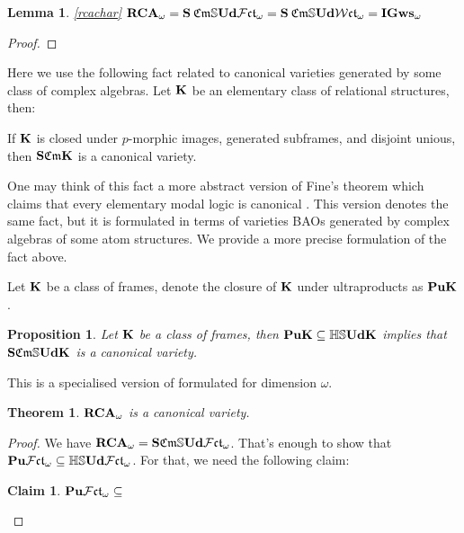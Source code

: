 \documentclass[a4paper]{article}
\theoremstyle{defin}
\theoremstyle{theorem}
\newtheorem{theorem}{Theorem}
\theoremstyle{claim}
\newtheorem{claim}{Claim}
\theoremstyle{prop}
\newtheorem{prop}{Proposition}
\theoremstyle{lemma}
\newtheorem{lemma}{Lemma}
\theoremstyle{fact}
\theoremstyle{ex}
\theoremstyle{col}
\begin{document}
\begin{lemma} \ref{rcachar}
${\bf RCA}_{\omega} = {\bf S} \: \mathfrak{Cm} \mathbb{S} {\bf Ud} \mathcal{F} \mathfrak{ct}_{\omega} = {\bf S} \: \mathfrak{Cm} \mathbb{S} {\bf Ud} \mathcal{W} \mathfrak{ct}_{\omega} = {\bf IGws}_{\omega}$
\end{lemma}

\begin{proof}

\end{proof}

Here we use the following fact related to canonical varieties generated by some class of complex algebras. Let ${\bf K}$ be an elementary class of relational structures, then:
\begin{center}
If ${\bf K}$ is closed under $p$-morphic images, generated subframes, and disjoint unious, \\ then ${\bf S} \mathfrak{Cm} {\bf K}$ is a canonical variety.
\end{center}
One may think of this fact a more abstract version of Fine's theorem which claims that every elementary modal logic is canonical \cite{fine1975some}. This version denotes the same fact, but it is formulated in terms of varieties BAOs generated by complex algebras of some atom structures. We provide a more precise formulation of the fact above.

Let ${\bf K}$ be a class of frames, denote the closure of ${\bf K}$ under ultraproducts as ${\bf Pu} {\bf K}$.

\begin{prop}
Let ${\bf K}$ be a class of frames, then ${\bf Pu}{\bf K} \subseteq \mathbb{H}\mathbb{S}{\bf Ud} {\bf K}$ implies that ${\bf S} \mathfrak{Cm} \mathbb{S}{\bf Ud} {\bf K}$ is a canonical variety.
\end{prop}

This is a specialised version of \cite[Theorem 4.4]{goldblatt1995elementary} formulated for dimension $\omega$.

\begin{theorem}
${\bf RCA}_{\omega}$ is a canonical variety.
\end{theorem}

\begin{proof}
We have ${\bf RCA}_{\omega} = {\bf S} \mathfrak{Cm} \mathbb{S} {\bf Ud} \mathcal{F} \mathfrak{ct}_{\omega}$.
That's enough to show that ${\bf Pu} \mathcal{F} \mathfrak{ct}_{\omega} \subseteq \mathbb{H}\mathbb{S}{\bf Ud} \mathcal{F} \mathfrak{ct}_{\omega}$.
For that, we need the following claim:
\begin{claim}\label{claim1}
${\bf Pu} \mathcal{F} \mathfrak{ct}_{\omega} \subseteq$
\end{claim}
\end{proof}
\end{document}
